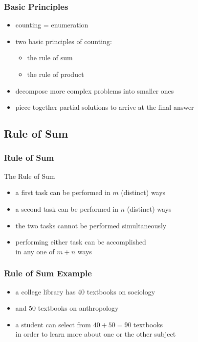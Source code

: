 \documentclass[dvipsnames]{beamer}
\begin{document}
\begin{frame}
  \frametitle{Basic Principles}

  \begin{itemize}
    \item counting = enumeration

    \pause
    \medskip
    \item two basic principles of counting:
    \begin{itemize}
      \item the rule of sum
      \item the rule of product
    \end{itemize}

    \item decompose more complex problems into smaller ones
    \item piece together partial solutions to arrive at the final answer
  \end{itemize}
\end{frame}

\subsection{Rule of Sum}

\begin{frame}
  \frametitle{Rule of Sum}

  \begin{block}{The Rule of Sum}
    \begin{itemize}
      \item a first task can be performed in $m$ (distinct) ways
      \item a second task can be performed in $n$ (distinct) ways
      \item the two tasks cannot be performed simultaneously

      \medskip
      \item performing either task can be accomplished\\
    in any one of $m+n$ ways
    \end{itemize}
  \end{block}
\end{frame}

\begin{frame}
  \frametitle{Rule of Sum Example}

  \begin{example}
    \begin{itemize}
      \item a college library has 40 textbooks on sociology
      \item and 50 textbooks on anthropology

      \medskip
      \item a student can select from $40 + 50 = 90$ textbooks\\
        in order to learn more about one or the other subject
    \end{itemize}
  \end{example}
\end{frame}
\end{document}

